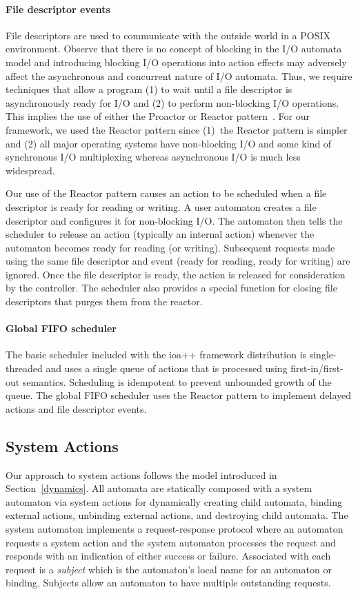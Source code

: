 \paragraph*{File descriptor events}
File descriptors are used to communicate with the outside world in a POSIX environment.
Observe that there is no concept of blocking in the I/O automata model and introducing blocking I/O operations into action effects may adversely affect the asynchronous and concurrent nature of I/O automata.
Thus, we require techniques that allow a program (1) to wait until a file descriptor is asynchronously ready for I/O and (2) to perform non-blocking I/O operations.
This implies the use of either the Proactor or Reactor pattern~\cite{schmidt2000pattern}.
For our framework, we used the Reactor pattern since (1)~the Reactor pattern is simpler and (2) all major operating systems have non-blocking I/O and some kind of synchronous I/O multiplexing whereas asynchronous I/O is much less widespread.

Our use of the Reactor pattern causes an action to be scheduled when a file descriptor is ready for reading or writing.
A user automaton creates a file descriptor and configures it for non-blocking I/O.
The automaton then tells the scheduler to release an action (typically an internal action) whenever the automaton becomes ready for reading (or writing).
Subsequent requests made using the same file descriptor and event (ready for reading, ready for writing) are ignored.
Once the file descriptor is ready, the action is released for consideration by the controller.
The scheduler also provides a special function for closing file descriptors that purges them from the reactor.

\paragraph*{Global FIFO scheduler}
The basic scheduler included with the ioa++ framework distribution is single-threaded and uses a single queue of actions that is processed using first-in/first-out semantics.
Scheduling is idempotent to prevent unbounded growth of the queue.
The global FIFO scheduler uses the Reactor pattern to implement delayed actions and file descriptor events.

\subsection{System Actions\label{system_action_section}}

Our approach to system actions follows the model introduced in Section~\ref{dynamics}.
All automata are statically composed with a system automaton via system actions for dynamically creating child automata, binding external actions, unbinding external actions, and destroying child automata.
The system automaton implements a request-response protocol where an automaton requests a system action and the system automaton processes the request and responds with an indication of either success or failure.
Associated with each request is a \emph{subject} which is the automaton's local name for an automaton or binding.
Subjects allow an automaton to have multiple outstanding requests.

